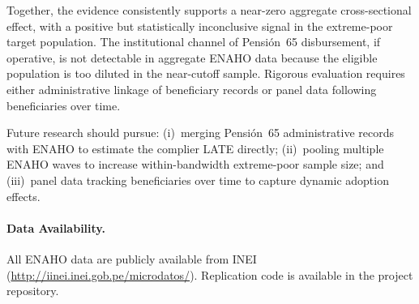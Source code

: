 \documentclass[12pt]{article}
\begin{document}
Together, the evidence consistently supports a near-zero aggregate
cross-sectional effect, with a positive but statistically inconclusive
signal in the extreme-poor target population. The institutional channel of
Pensi\'on~65 disbursement, if operative, is not detectable in aggregate
ENAHO data because the eligible population is too diluted in the
near-cutoff sample. Rigorous evaluation requires either administrative
linkage of beneficiary records or panel data following beneficiaries
over time.

Future research should pursue: (i)~merging Pensi\'on~65 administrative
records with ENAHO to estimate the complier LATE directly; (ii)~pooling
multiple ENAHO waves to increase within-bandwidth extreme-poor sample size;
and (iii)~panel data tracking beneficiaries over time to capture dynamic
adoption effects.

\paragraph{Data Availability.}
All ENAHO data are publicly available from INEI
(\url{http://iinei.inei.gob.pe/microdatos/}). Replication code is available
in the project repository.


\clearpage

\begin{table}[H]
\centering
\caption{Summary Statistics by Age-65 Cutoff (Full ENAHO Sample)}
\label{tab:summary}

\end{table}

\begin{table}[H]
\centering
\caption{Main RDD Estimates: Full ENAHO Sample (Primary Design)}
\label{tab:main}

\end{table}

\begin{table}[H]
\centering
\caption{Heterogeneity Analysis: Extreme-Poor Subgroup and Urban/Rural Split}
\label{tab:heterogeneity}

\end{table}

\begin{table}[H]
\centering
\caption{Robustness Checks (Full ENAHO Sample)}
\label{tab:robustness}

\end{table}
\end{document}
